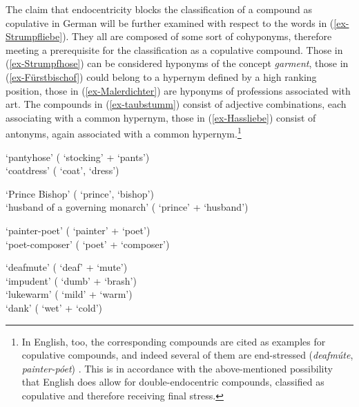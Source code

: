 \documentclass[output=paper
 ,nobabel
 ,draftmode
 ,colorlinks, citecolor=brown
]{langscibook}
\begin{document}
The claim that endocentricity blocks the classification of a compound as copulative in German will be further examined with respect to the words in (\ref{ex-Strumpfliebe}). They all are composed of some sort of cohyponyms, therefore meeting a prerequisite for the classification as a copulative compound.
Those in (\ref{ex-Strumpfhose}) can be considered hyponyms of the concept \emph{garment}, those in
(\ref{ex-Fürstbischof}) could belong to a hypernym defined by a high ranking position, those in
(\ref{ex-Malerdichter}) are hyponyms of professions associated with art. The compounds in
(\ref{ex-taubstumm}) consist of adjective combinations, each associating with a common hypernym,
those in (\ref{ex-Hassliebe}) consist of antonyms, again associated with a common
hypernym.\footnote{In English, too, the corresponding compounds are cited as examples for copulative
  compounds, and indeed several of them are end-stressed (\eg \emph{deafmúte}, \emph{painter-póet})
  \citep[61]{Olsen2000}. This is in accordance with the above-mentioned possibility that English
  does allow for double-endocentric compounds, classified as copulative and therefore receiving
  final stress.}

\eal\label{ex-Strumpfliebe}
\ex\label{ex-Strumpfhose}
 `pantyhose' ( `stocking' +  `pants') \\ 
 `coatdress' ( `coat',  `dress')

\ex\label{ex-Fürstbischof}
 `Prince Bishop' ( `prince',  `bishop') \\
 `husband of a governing monarch' ( `prince' +  `husband')

\ex\label{ex-Malerdichter}
 `painter-poet' ( `painter' +  `poet') \\
 `poet-composer' ( `poet' +  `composer')

\ex\label{ex-taubstumm}
 `deafmute' ( `deaf' +  `mute') \\
 `impudent' ( `dumb' +  `brash') \\
 `lukewarm' ( `mild' +  `warm') \\
 `dank' ( `wet' +  `cold') \\
\end{document}
